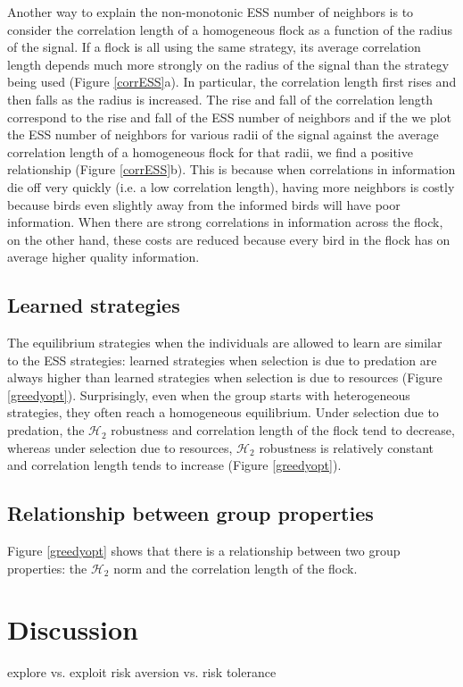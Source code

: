 \documentclass{article}
\begin{document}
Another way to explain the non-monotonic ESS number of neighbors is to consider the correlation length of a homogeneous flock as a function of the radius of the signal. If a flock is all using the same strategy, its average correlation length depends much more strongly on the radius of the signal than the strategy being used (Figure \ref{corrESS}a). In particular, the correlation length first rises and then falls as the radius is increased. The rise and fall of the correlation length correspond to the rise and fall of the ESS number of neighbors and if the we plot the ESS number of neighbors for various radii of the signal against the average correlation length of a homogeneous flock for that radii, we find a positive relationship (Figure \ref{corrESS}b). This is because when correlations in information die off very quickly (i.e. a low correlation length), having more neighbors is costly because birds even slightly away from the informed birds will have poor information. When there are strong correlations in information across the flock, on the other hand, these costs are reduced because every bird in the flock has on average higher quality information.

\subsection{Learned strategies }
The equilibrium strategies when the individuals are allowed to learn are similar to the ESS strategies: learned strategies when selection is due to predation are always higher than learned strategies when selection is due to resources (Figure \ref{greedyopt}). Surprisingly, even when the group starts with heterogeneous strategies, they often reach a homogeneous equilibrium. Under selection due to predation, the $\mathscr{H}_2$ robustness and correlation length of the flock tend to decrease, whereas under selection due to resources, $\mathscr{H}_2$ robustness is relatively constant and correlation length tends to increase (Figure \ref{greedyopt}).

\subsection{Relationship between group properties }
Figure \ref{greedyopt} shows that there is a relationship between two group properties: the $\mathscr{H}_2$ norm and the correlation length of the flock.

\section{Discussion}
explore vs. exploit 
risk aversion vs. risk tolerance
\end{document}
